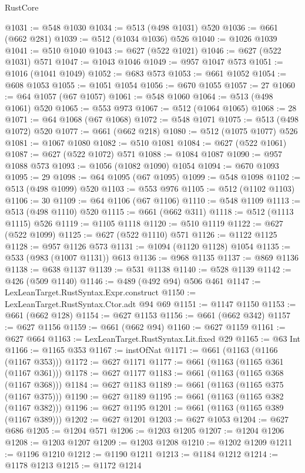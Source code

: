 \begin{lexlean}{RustCore}
\begin{coremodule}
@1031 := @548 @1030
@1034 := @513 (@498 @1031) @520
@1036 := @661 (@662 @281)
@1039 := @512 (@1034 @1036) @526
@1040 := @1026 @1039
@1041 := @510 @1040
@1043 := @627 (@522 @1021)
@1046 := @627 (@522 @1031) @571
@1047 := @1043 @1046
@1049 := @957 @1047 @573
@1051 := @1016 (@1041 @1049)
@1052 := @683 @573
@1053 := @661 @1052
@1054 := @608 @1053
@1055 := @1051 @1054
@1056 := @670 @1055
@1057 := 27
@1060 := @64 @1057 (@67 @1057)
@1061 := @548 @1060
@1064 := @513 (@498 @1061) @520
@1065 := @553 @973
@1067 := @512 (@1064 @1065)
@1068 := 28
@1071 := @64 @1068 (@67 @1068)
@1072 := @548 @1071
@1075 := @513 (@498 @1072) @520
@1077 := @661 (@662 @218)
@1080 := @512 (@1075 @1077) @526
@1081 := @1067 @1080
@1082 := @510 @1081
@1084 := @627 (@522 @1061)
@1087 := @627 (@522 @1072) @571
@1088 := @1084 @1087
@1090 := @957 @1088 @573
@1093 := @1056 (@1082 @1090) @1054
@1094 := @670 @1093
@1095 := 29
@1098 := @64 @1095 (@67 @1095)
@1099 := @548 @1098
@1102 := @513 (@498 @1099) @520
@1103 := @553 @976
@1105 := @512 (@1102 @1103)
@1106 := 30
@1109 := @64 @1106 (@67 @1106)
@1110 := @548 @1109
@1113 := @513 (@498 @1110) @520
@1115 := @661 (@662 @311)
@1118 := @512 (@1113 @1115) @526
@1119 := @1105 @1118
@1120 := @510 @1119
@1122 := @627 (@522 @1099)
@1125 := @627 (@522 @1110) @571
@1126 := @1122 @1125
@1128 := @957 @1126 @573
@1131 := @1094 (@1120 @1128) @1054
@1135 := @533 (@983 (@1007 @1131)) @613
@1136 := @968 @1135
@1137 := @869 @1136
@1138 := @638 @1137
@1139 := @531 @1138
@1140 := @528 @1139
@1142 := @426 (@509 @1140)
@1146 := @489 (@492 @94) @506 @461
@1147 := LexLeanTarget.RustSyntax.Expr.construct
@1150 := LexLeanTarget.RustSyntax.Ctor.adt @94 @69
@1151 := @1147 @1150
@1153 := @661 (@662 @128)
@1154 := @627 @1153
@1156 := @661 (@662 @342)
@1157 := @627 @1156
@1159 := @661 (@662 @94)
@1160 := @627 @1159
@1161 := @627 @664
@1163 := LexLeanTarget.RustSyntax.Lit.fixed @29
@1165 := @63 Int
@1166 := @1165 @353
@1167 := instOfNat
@1171 := @661 (@1163 (@1166 (@1167 @353)))
@1172 := @627 @1171
@1177 := @661 (@1163 (@1165 @361 (@1167 @361)))
@1178 := @627 @1177
@1183 := @661 (@1163 (@1165 @368 (@1167 @368)))
@1184 := @627 @1183
@1189 := @661 (@1163 (@1165 @375 (@1167 @375)))
@1190 := @627 @1189
@1195 := @661 (@1163 (@1165 @382 (@1167 @382)))
@1196 := @627 @1195
@1201 := @661 (@1163 (@1165 @389 (@1167 @389)))
@1202 := @627 @1201
@1203 := @627 @1053
@1204 := @627 @686
@1205 := @1204 @571
@1206 := @1203 @1205
@1207 := @1204 @1206
@1208 := @1203 @1207
@1209 := @1203 @1208
@1210 := @1202 @1209
@1211 := @1196 @1210
@1212 := @1190 @1211
@1213 := @1184 @1212
@1214 := @1178 @1213
@1215 := @1172 @1214

\end{coremodule}
\end{lexlean}
